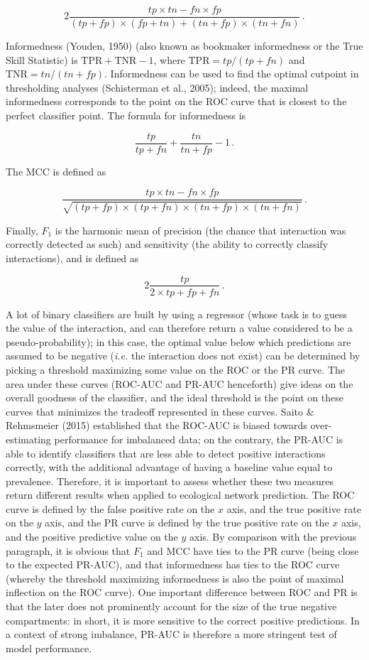 \documentclass[10pt,oneside]{article}
\begin{document}
\[
2\frac{tp\times tn - fn\times fp}{(tp+fp)\times (fp+tn)+(tn+fp)\times (tn+fn)} \,.
\]

Informedness (Youden, 1950) (also known as bookmaker informedness or the
True Skill Statistic) is \(\text{TPR}+\text{TNR}-1\), where
\(\text{TPR}= tp/(tp+fn)\) and \(\text{TNR} = tn/(tn+fp)\). Informedness
can be used to find the optimal cutpoint in thresholding analyses
(Schisterman et al., 2005); indeed, the maximal informedness corresponds
to the point on the ROC curve that is closest to the perfect classifier
point. The formula for informedness is

\[\frac{tp}{tp+fn}+\frac{tn}{tn+fp}-1\,.\]

The MCC is defined as

\[
\frac{tp\times tn - fn\times fp}{\sqrt{(tp+fp)\times (tp+fn)\times (tn+fp)\times (tn+fn)}} \,.
\]

Finally, \(F_1\) is the harmonic mean of precision (the chance that
interaction was correctly detected as such) and sensitivity (the ability
to correctly classify interactions), and is defined as

\[
2\frac{tp}{2\times tp + fp + fn}\,.
\]

A lot of binary classifiers are built by using a regressor (whose task
is to guess the value of the interaction, and can therefore return a
value considered to be a pseudo-probability); in this case, the optimal
value below which predictions are assumed to be negative (\emph{i.e.}
the interaction does not exist) can be determined by picking a threshold
maximizing some value on the ROC or the PR curve. The area under these
curves (ROC-AUC and PR-AUC henceforth) give ideas on the overall
goodness of the classifier, and the ideal threshold is the point on
these curves that minimizes the tradeoff represented in these curves.
Saito \& Rehmsmeier (2015) established that the ROC-AUC is biased
towards over-estimating performance for imbalanced data; on the
contrary, the PR-AUC is able to identify classifiers that are less able
to detect positive interactions correctly, with the additional advantage
of having a baseline value equal to prevalence. Therefore, it is
important to assess whether these two measures return different results
when applied to ecological network prediction. The ROC curve is defined
by the false positive rate on the \(x\) axis, and the true positive rate
on the \(y\) axis, and the PR curve is defined by the true positive rate
on the \(x\) axis, and the positive predictive value on the \(y\) axis.
By comparison with the previous paragraph, it is obvious that \(F_1\)
and MCC have ties to the PR curve (being close to the expected PR-AUC),
and that informedness has ties to the ROC curve (whereby the threshold
maximizing informedness is also the point of maximal inflection on the
ROC curve). One important difference between ROC and PR is that the
later does not prominently account for the size of the true negative
compartments: in short, it is more sensitive to the correct positive
predictions. In a context of strong imbalance, PR-AUC is therefore a
more stringent test of model performance.
\end{document}
